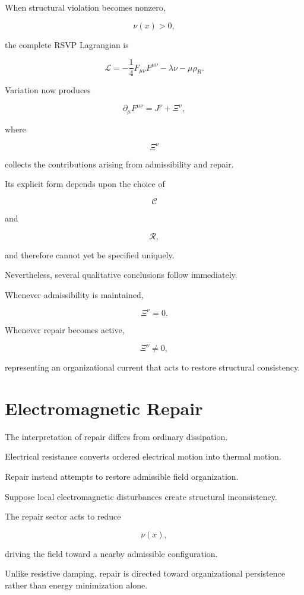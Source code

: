 \documentclass[11pt,oneside]{book}
\numberwithin{equation}{chapter}
\theoremstyle{definition}
\theoremstyle{plain}
\begin{document}
When structural violation becomes nonzero,

\[
\nu(x)>0,
\]

the complete RSVP Lagrangian is

\[
\mathcal L
=
-
\frac14
F_{\mu\nu}F^{\mu\nu}
-
\lambda\nu
-
\mu\rho_R.
\]

Variation now produces

\[
\partial_\mu
F^{\mu\nu}
=
J^\nu
+
\Xi^\nu,
\]

where

\[
\Xi^\nu
\]

collects the contributions arising from admissibility and repair.

Its explicit form depends upon the choice of

\[
\mathcal C
\]

and

\[
\mathcal R,
\]

and therefore cannot yet be specified uniquely.

Nevertheless, several qualitative conclusions follow immediately.

Whenever admissibility is maintained,

\[
\Xi^\nu=0.
\]

Whenever repair becomes active,

\[
\Xi^\nu
\neq
0,
\]

representing an organizational current that acts to restore structural
consistency.

\section{Electromagnetic Repair}

The interpretation of repair differs from ordinary dissipation.

Electrical resistance converts ordered electrical motion into thermal
motion.

Repair instead attempts to restore admissible field organization.

Suppose local electromagnetic disturbances create structural inconsistency.

The repair sector acts to reduce

\[
\nu(x),
\]

driving the field toward a nearby admissible configuration.

Unlike resistive damping, repair is directed toward organizational
persistence rather than energy minimization alone.
\end{document}
